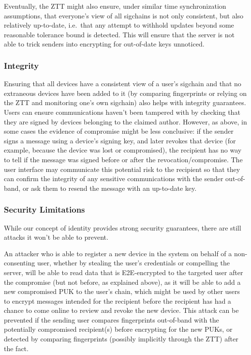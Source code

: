 Eventually, the ZTT might also ensure, under similar time synchronization assumptions, that
everyone's view of all sigchains is not only consistent, but also relatively up-to-date, i.e.\ that
any attempt to withhold updates beyond some reasonable tolerance bound is detected. This will ensure
that the server is not able to trick senders into encrypting for out-of-date keys unnoticed.

\subsubsection{Integrity}
Ensuring that all devices have a consistent view of a user's sigchain and that no extraneous devices
have been added to it (by comparing fingerprints or relying on the ZTT and monitoring one's own
sigchain) also helps with integrity guarantees. Users can ensure communications haven't been
tampered with by checking that they are signed by devices belonging to the claimed author. However,
as above, in some cases the evidence of compromise might be less conclusive: if the sender signs a
message using a device's signing key, and later revokes that device (for example, because the device
was lost or compromised), the recipient has no way to tell if the message was signed before or after
the revocation/compromise. The user interface may communicate this potential risk to the recipient
so that they can confirm the integrity of any sensitive communications with the sender out-of-band,
or ask them to resend the message with an up-to-date key.

\subsubsection{Security Limitations}

While our concept of identity provides strong security guarantees, there are still attacks it won't
be able to prevent.

An attacker who is able to register a new device in the system on behalf of a non-consenting user,
whether by stealing the user's credentials or compelling the server, will be able to read data that
is E2E-encrypted to the targeted user after the compromise (but not before, as explained above), as
it will be able to add a new compromised PUK to the user's chain, which might be used by other users
to encrypt messages intended for the recipient before the recipient has had a chance to come online
to review and revoke the new device. This attack can be prevented if the sending user compares
fingerprints out-of-band with the potentially compromised recipient(s) before encrypting for the new
PUKs, or detected by comparing fingerprints (possibly implicitly through the ZTT) after the fact.

